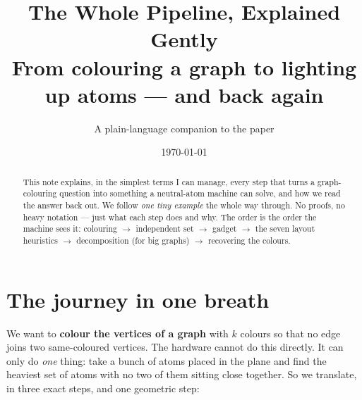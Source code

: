 \documentclass[11pt]{article}
\title{\textbf{The Whole Pipeline, Explained Gently}\\[0.4em]
  \large From colouring a graph to lighting up atoms --- and back again}
\author{A plain-language companion to the paper}
\date{\today}
\begin{document}
\maketitle

\begin{abstract}
\noindent This note explains, in the simplest terms I can manage, every step that
turns a graph-colouring question into something a neutral-atom machine can solve,
and how we read the answer back out. We follow \emph{one tiny example} the whole
way through. No proofs, no heavy notation --- just what each step does and why.
The order is the order the machine sees it: colouring $\to$ independent set $\to$
gadget $\to$ the seven layout heuristics $\to$ decomposition (for big graphs)
$\to$ recovering the colours.
\end{abstract}

\tableofcontents

\section{The journey in one breath}

We want to \textbf{colour the vertices of a graph} with $k$ colours so that no
edge joins two same-coloured vertices. The hardware cannot do this directly. It
can only do \emph{one} thing: take a bunch of atoms placed in the plane and find
the heaviest set of atoms with no two of them sitting close together. So we
translate, in three exact steps, and one geometric step:

\begin{center}
\end{center}
\end{document}

